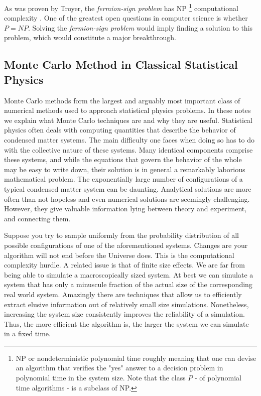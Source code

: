 As was proven by Troyer, the \emph{fermion-sign problem} has NP \footnote{NP or nondeterministic polynomial time roughly meaning that one can devise an algorithm that verifies the "yes" answer to a decision problem in polynomial time in the system size.
Note that the class $P$ - of polynomial time algorithms - is a subclass of NP.} computational complexity \cite{troyer_computational_2005}.
One of the greatest open questions in computer science is whether $P = NP$.
Solving the \emph{fermion-sign problem} would imply finding a solution to this problem, which would constitute a major breakthrough.

\subsection{Monte Carlo Method in  Classical Statistical Physics}

Monte Carlo methods form the largest and arguably most important class of numerical methods used to approach statistical physics problems. In these notes we explain what Monte Carlo techniques are and why they are useful. Statistical physics often deals with computing quantities that describe the behavior of condensed matter systems. The main difficulty one faces when doing so has to do with the collective nature of these systems. Many identical components comprise these systems, and while the equations that govern the behavior of the whole may be easy to write down, their solution is in general a remarkably laborious mathematical problem. The exponentially large number of configurations of a typical condensed matter system can be daunting. Analytical solutions are more often than not hopeless and even numerical solutions are seemingly challenging. However, they give valuable information lying between theory and experiment, and connecting them.

Suppose you try to sample uniformly from the probability distribution of all possible configurations of one of the aforementioned systems. Changes are your algorithm will not end before the Universe does. This is the computational complexity hurdle. A related issue is that of finite size effects. We are far from being able to simulate a macroscopically sized system. At best we can simulate a system that has only a minuscule fraction of the actual size of the corresponding real world system. Amazingly there are techniques that allow us to efficiently extract elusive information out of relatively small size simulations. Nonetheless, increasing the system size consistently improves the reliability of a simulation. Thus, the more efficient the algorithm is, the larger the system we can simulate in a fixed time.

